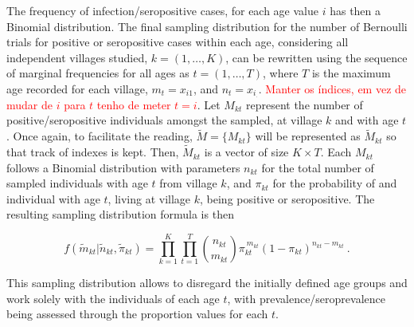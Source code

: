 \noindent
The frequency of infection/seropositive cases, for each age value $i$ has then a Binomial distribution.
The final sampling distribution for the number of Bernoulli trials for positive or seropositive cases within each age, considering all independent villages studied, $k=(1,\dots,K)$, can be rewritten using the sequence of marginal frequencies for all ages as $t=(1,\dots,T)$, where $T$ is the maximum age recorded for each village, $m_t=x_{i1}$, and $n_t=x_{i_\cdot}$. \textcolor{red}{Manter os índices, em vez de mudar de $i$ para $t$ tenho de meter $t=i$}.
Let $M_{kt}$ represent the number of positive/seropositive individuals amongst the sampled, at village $k$ and with age $t$.
Once again, to facilitate the reading, $\tilde{M}=\{M_{kt}\}$ will be represented as $\tilde{M}_{kt}$ so that track of indexes is kept.
Then, $\tilde{M}_{kt}$ is a vector of size $K\times T$.
Each $M_{kt}$ follows a Binomial distribution with parameters $n_{kt}$ for the total number of sampled individuals with age $t$ from village $k$, and $\pi_{kt}$ for the probability of and individual with age $t$, living at village $k$, being positive or seropositive. 
The resulting sampling distribution formula is then

\begin{equation}
\label{eq:sampling.distribution}
f(\tilde{m}_{kt} | \tilde{n}_{kt}, \tilde{\pi}_{kt}) = \prod_{k=1}^K \prod_{t=1}^T \binom{n_{kt}}{m_{kt}} \pi_{kt}^{\ m_{kt}} (1-\pi_{kt})^{n_{kt} - m_{kt}}\ .
\end{equation}

\noindent
This sampling distribution allows to disregard the initially defined age groups and work solely with the individuals of each age $t$, with prevalence/seroprevalence being assessed through the proportion values for each $t$.

